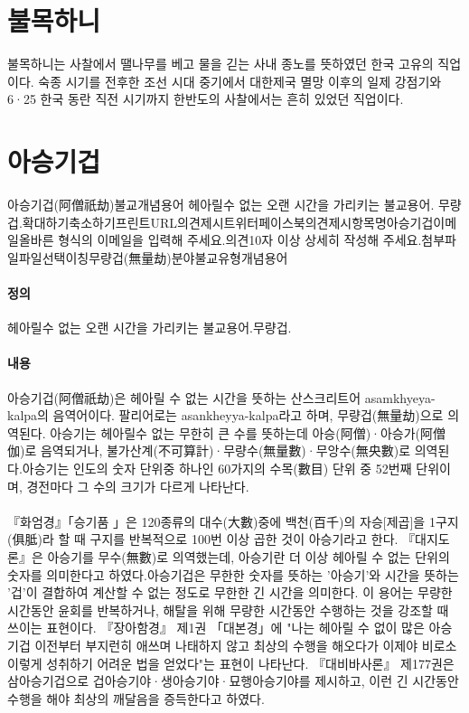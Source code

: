 \documentclass[12pt, a4paper, oneside]{book}
\let\stdsection\section
\renewcommand\section{\newpage\stdsection}
\begin{document}
	\section{ 불목하니}

불목하니는 사찰에서 땔나무를 베고 물을 긷는 사내 종노를 뜻하였던 한국 고유의 직업이다. 
숙종 시기를 전후한 조선 시대 중기에서 대한제국 멸망 이후의 일제 강점기와 6·25 한국 동란 직전 시기까지 한반도의 사찰에서는 흔히 있었던 직업이다.




%										
	\section{ 아승기겁}
		아승기겁(阿僧祇劫)불교개념용어
             헤아릴수 없는 오랜 시간을 가리키는 불교용어.
                무량겁.확대하기축소하기프린트URL의견제시트위터페이스북의견제시항목명아승기겁이메일올바른 형식의 이메일을 입력해 주세요.의견10자 이상 상세히 작성해 주세요.첨부파일파일선택이칭무량겁(無量劫)분야불교유형개념용어
 \paragraph{정의}
            헤아릴수 없는 오랜 시간을 가리키는 불교용어.무량겁.
 \paragraph{내용}
아승기겁(阿僧祇劫)은 헤아릴 수 없는 시간을 뜻하는 산스크리트어 asamkhyeya-kalpa의 음역어이다. 팔리어로는 asankheyya-kalpa라고 하며, 무량겁(無量劫)으로 의역된다. 아승기는 헤아릴수 없는 무한히 큰 수를 뜻하는데 아승(阿僧)·아승가(阿僧伽)로 음역되거나, 불가산계(不可算計)·무량수(無量數)·무앙수(無央數)로 의역된다.아승기는 인도의 숫자 단위중 하나인 60가지의 수목(數目) 단위 중 52번째 단위이며, 경전마다 그 수의 크기가 다르게 나타난다. 
 \paragraph{}
『화엄경』「승기품 」은 120종류의 대수(大數)중에 백천(百千)의 자승[제곱]을 1구지(俱胝)라 할 때 구지를 반복적으로 100번 이상 곱한 것이 아승기라고 한다. 『대지도론』은 아승기를 무수(無數)로 의역했는데, 아승기란 더 이상 헤아릴 수 없는 단위의 숫자를 의미한다고 하였다.아승기겁은 무한한 숫자를 뜻하는 '아승기'와 시간을 뜻하는 '겁'이 결합하여 계산할 수 없는 정도로 무한한 긴 시간을 의미한다. 이 용어는 무량한 시간동안 윤회를 반복하거나, 해탈을 위해 무량한 시간동안 수행하는 것을 강조할 때 쓰이는 표현이다. 『장아함경』 제1권 「대본경」에 "나는 헤아릴 수 없이 많은 아승기겁 이전부터 부지런히 애쓰며 나태하지 않고 최상의 수행을 해오다가 이제야 비로소 이렇게 성취하기 어려운 법을 얻었다"는 표현이 나타난다. 『대비바사론』 제177권은 삼아승기겁으로 겁아승기야·생아승기야·묘행아승기야를 제시하고, 이런 긴 시간동안 수행을 해야 최상의 깨달음을 증득한다고 하였다.
\end{document}
